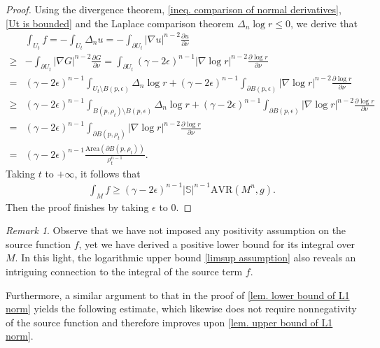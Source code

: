 \documentclass[12pt]{amsart}
\theoremstyle{plain}
\theoremstyle{definition}
\theoremstyle{remark}     %
\newtheorem{remark}[theorem]{Remark}
\begin{document}
\begin{proof}
    Using   the divergence theorem, \cref{ineq. comparison of normal derivatives}, \cref{Ut is bounded} and the Laplace comparison theorem $\Delta_n\log r\leq 0$, we derive that
    \begin{align*}
        &\int_{U_t}f
        =-\int_{U_t}\Delta_n u
        =-\int_{\partial U_t}|\nabla u|^{n-2}\frac{\partial u}{\partial\nu}\\
        \geq& -\int_{\partial U_t}
        |\nabla G|^{n-2}\frac{\partial G}{\partial\nu}
        =\int_{\partial U_t}
        (\gamma-2\epsilon)^{n-1}
        |\nabla \log r|^{n-2}
        \frac{\partial\log r}{\partial\nu}\\
        =&(\gamma-2\epsilon)^{n-1}
        \int_{U_t\setminus B(p,\epsilon)}
        \Delta_n\log r
        +(\gamma-2\epsilon)^{n-1}
        \int_{\partial B(p,\epsilon)}
        |\nabla \log r|^{n-2}
        \frac{\partial\log r}{\partial\nu}\\
        \geq& (\gamma-2\epsilon)^{n-1}
        \int_{B(p,\rho_t)\setminus B(p,\epsilon)}
        \Delta_n\log r
        +(\gamma-2\epsilon)^{n-1}
        \int_{\partial B(p,\epsilon)}
        |\nabla \log r|^{n-2}
        \frac{\partial\log r}{\partial\nu}\\
        =&(\gamma-2\epsilon)^{n-1}
        \int_{\partial B(p,\rho_t)}
        |\nabla \log r|^{n-2}
        \frac{\partial\log r}{\partial\nu}\\
        =&(\gamma-2\epsilon)^{n-1}
        \frac{\mathrm{Area}(\partial B(p, \rho_t))}{\rho_t^{n-1}}.
    \end{align*}
    Taking $t$ to $+\infty$, it follows that
    \begin{align*}
        \int_M f
        \geq (\gamma-2\epsilon)^{n-1}
        |\mathbb{S}|^{n-1}
        \mathrm{AVR}(M^n,g).
    \end{align*}
    Then the proof finishes by taking $\epsilon$ to $0$.
\end{proof}
\begin{remark}
    Observe that we have not imposed any positivity assumption on the source function $f$, yet we have derived a positive lower bound for its integral over $M$.
    In this light, the logarithmic upper bound \cref{limsup assumption} also reveals an intriguing connection to the integral of the source term $f$.
\end{remark}
Furthermore, a similar argument to that in the proof of \cref{lem. lower bound of L1 norm} yields the following estimate, which likewise does not require nonnegativity of the source function and therefore improves upon \cref{lem. upper bound of L1 norm}.
\end{document}
